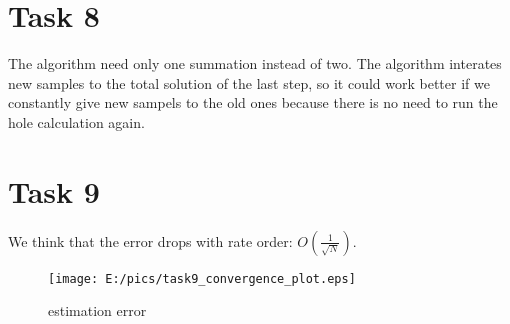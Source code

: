 \documentclass{article}
\begin{document}
\section*{Task 8}
The algorithm need only one summation instead of two. The algorithm interates new samples to the total solution of the last step, so it could work better if we constantly give new sampels to the old ones because there is no need to run the hole calculation again. 

\newpage
\section*{Task 9}
We think that the error drops with rate order: $O\left(\frac{1}{\sqrt{N}}\right)$.
\begin{figure}[htbp]
	\centering
		\texttt{[image: E:/pics/task9\_convergence\_plot.eps]}
	\caption{estimation error}
	\label{fig:task9_convergence_plot}
\end{figure}
\end{document}
